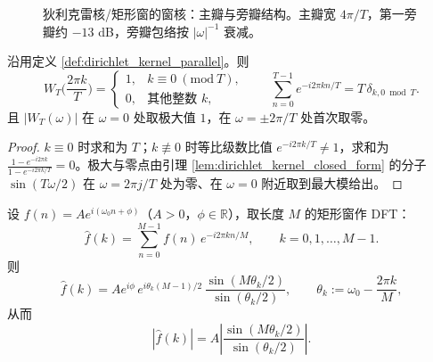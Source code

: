 \begin{figure}[htbp]
\centering
{}
\caption{狄利克雷核/矩形窗的窗核：主瓣与旁瓣结构。主瓣宽 $4\pi/T$，第一旁瓣约 $-13$ dB，旁瓣包络按 $|\omega|^{-1}$ 衰减。}
\label{fig:dirichlet_kernel}
\end{figure}

\begin{lemma}[窗核的正交性与主瓣位置]\label{lem:window_kernel_orthogonality_parallel}
沿用定义 \ref{def:dirichlet_kernel_parallel}。则
\[
W_T\Big(\frac{2\pi k}{T}\Big)=\begin{cases}1, & k\equiv0\ (\mathrm{mod}\ T),\\[2pt]0, & \text{其他整数 }k,\end{cases}
\qquad
\sum_{n=0}^{T-1}e^{-i2\pi kn/T}=T\,\delta_{k,0\bmod T}.
\]
且 $|W_T(\omega)|$ 在 $\omega=0$ 处取极大值 $1$，在 $\omega=\pm2\pi/T$ 处首次取零。
\end{lemma}

\begin{proof}
$k\equiv0$ 时求和为 $T$；$k\not\equiv0$ 时等比级数比值 $e^{-i2\pi k/T}\ne1$，求和为 $\frac{1-e^{-i2\pi k}}{1-e^{-i2\pi k/T}}=0$。极大与零点由引理 \ref{lem:dirichlet_kernel_closed_form} 的分子 $\sin(T\omega/2)$ 在 $\omega=2\pi j/T$ 处为零、在 $\omega=0$ 附近取到最大模给出。
\end{proof}

\begin{proposition}[单频截断的泄露公式]\label{prop:single_tone_leakage_parallel}
设 $f(n)=A e^{i(\omega_0 n+\phi)}$（$A>0$，$\phi\in\mathbb{R}$），取长度 $M$ 的矩形窗作 DFT：
\[
\hat f(k)=\sum_{n=0}^{M-1}f(n)\,e^{-i2\pi kn/M},\qquad k=0,1,\dots,M-1.
\]
则
\[
\hat f(k)=A e^{i\phi}\,e^{i\theta_k(M-1)/2}\,\frac{\sin(M\theta_k/2)}{\sin(\theta_k/2)},
\qquad \theta_k:=\omega_0-\frac{2\pi k}{M},
\]
从而
\[
|\hat f(k)|=A\left|\frac{\sin(M\theta_k/2)}{\sin(\theta_k/2)}\right|.
\]
\end{proposition}

